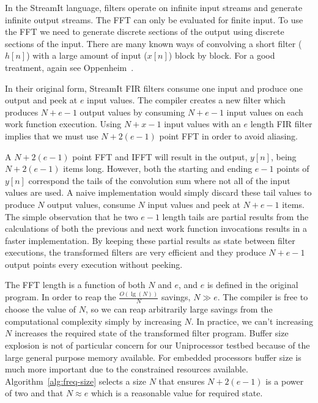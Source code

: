 In the StreamIt language, filters operate on infinite input streams 
and generate infinite output streams.
The FFT can only be evaluated for finite input. To use the FFT we need to
generate discrete sections of the output using discrete sections of the input.
There are many known ways of convolving a short filter ($h[n]$) with
a large amount of input ($x[n]$) block by block.
For a good treatment, again see Oppenheim~\cite{oppenheim-discrete}. 

In their original form, StreamIt FIR filters consume one input and 
produce one output and peek at $e$ input values. The compiler creates 
a new filter which produces $N+e-1$ output values by consuming $N+e-1$ input 
values on each work function execution. 
Using $N+x-1$ input values with an $e$ length FIR filter implies that we
must use $N+2(e-1)$ point FFT in order to avoid aliasing.

A $N+2(e-1)$ point FFT and IFFT will result in the output, $y[n]$, being $N+2(e-1)$
items long. However, both the starting and ending $e-1$ points of $y[n]$ correspond
the tails of the convolution sum where not all of the input values are used. 
A naive implementation would simply discard these tail values to produce 
$N$ output values, consume $N$ input values and peek at $N+e-1$ items.
The simple observation that he two $e-1$ length tails are partial results from the 
calculations of both the previous and next work function invocations results in 
a faster implementation. By keeping these partial results as state between
filter executions, the transformed filters are very efficient and they 
produce $N+e-1$ output points every execution without peeking.

The FFT length is a function of both $N$ and $e$, and $e$ is defined in the
original program. In order to reap the $\frac{O(\lg(N))}{N}$ savings, 
$N \gg e$. The compiler is free to choose the value of $N$, 
so we can reap arbitrarily large savings from the computational complexity 
simply by increasing $N$. 
In practice, we can't increasing $N$ increases the required state
of the transformed filter program. Buffer size explosion is
not of particular concern for our Uniprocessor testbed because of the large
general purpose memory available. For embedded processors 
buffer size is much more important due to the constrained resources available.
Algorithm~\ref{alg:freq-size} selects a size $N$ that ensures 
$N+2(e-1)$ is a power of two and that $N \approx e$ which is a reasonable
value for required state.


